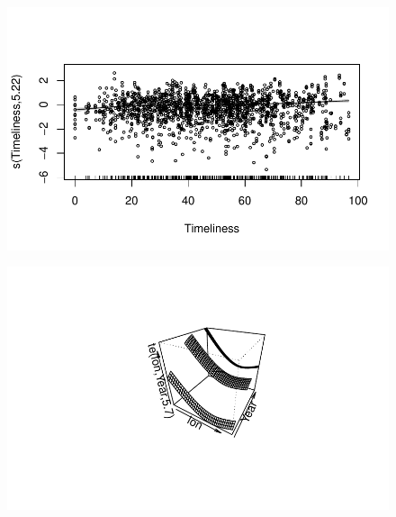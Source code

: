 \documentclass[
  letterpaper,
  DIV=11,
  numbers=noendperiod]{scrartcl}
\begin{document}
\begin{figure}[H]

{\centering \includegraphics{Group34Coursework_files/figure-pdf/unnamed-chunk-15-9.pdf}

}

\end{figure}

\begin{figure}[H]

{\centering \includegraphics{Group34Coursework_files/figure-pdf/unnamed-chunk-15-10.pdf}

}

\end{figure}
\end{document}
